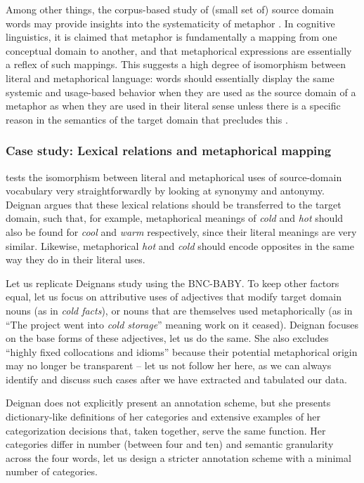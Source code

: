 Among other things, the corpus-based study of (small set of) source domain words may provide insights into the systematicity of metaphor \citep[cf. esp.]{deignan_metaphorical_1999}. In cognitive linguistics, it is claimed that metaphor is fundamentally a mapping from one conceptual domain to another, and that metaphorical expressions are essentially a reflex of such mappings. This suggests a high degree of isomorphism between literal and metaphorical language: words should essentially display the same systemic and usage-based behavior when they are used as the source domain of a metaphor as when they are used in their literal sense unless there is a specific reason in the semantics of the target domain that precludes this \citep{lakoff_contemporary_1993}.

\subsubsection{Case study: Lexical relations and metaphorical mapping}
\label{sec:antonymymetaphor}

\citet{deignan_metaphorical_1999} tests the isomorphism between literal and metaphorical uses of source-domain vocabulary very straightforwardly by looking at synonymy and antonymy. Deignan argues that these lexical relations should be transferred to the target domain, such that, for example, metaphorical meanings of \textit{cold} and \textit{hot} should also be found for \textit{cool} and \textit{warm} respectively, since their literal meanings are very similar. Likewise, metaphorical \textit{hot} and \textit{cold} should encode opposites in the same way they do in their literal uses.

Let us replicate Deignans study using the BNC-BABY. To keep other factors equal, let us focus on attributive uses of adjectives that modify target domain nouns (as in \textit{cold facts}), or nouns that are themselves used metaphorically (as in ``The project went into \textit{cold storage}'' meaning work on it ceased). Deignan focuses on the base forms of these adjectives, let us do the same. She also excludes ``highly fixed collocations and idioms'' because their potential metaphorical origin may no longer be transparent -- let us not follow her here, as we can always identify and discuss such cases after we have extracted and tabulated our data.

Deignan does not explicitly present an annotation scheme, but she presents dictionary-like definitions of her categories and extensive examples of her categorization decisions that, taken together, serve the same function. Her categories differ in number (between four and ten) and semantic granularity across the four words, let us design a stricter annotation scheme with a minimal number of categories.

